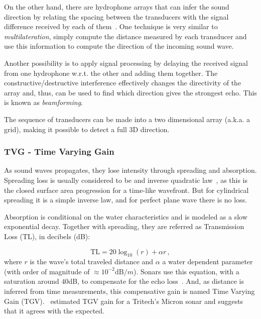 On the other hand, there are hydrophone arrays that can infer the sound
direction by relating the spacing between the transducers with the signal
difference received by each of them~\cite{bearing,beamforming}. One technique is
very similar to \textit{multilateration}, simply compute the distance measured
by each transducer and use this information to compute the direction of the
incoming sound wave.


Another possibility is to apply signal processing by delaying the received
signal from one hydrophone w.r.t. the other and adding them together. The
constructive/destructive interference effectively changes the directivity of the
array and, thus, can be used to find which direction gives the strongest echo.
This is known as \textit{beamforming}.

The sequence of transducers can be made into a two dimensional array
(a.k.a. a grid), making it possible to detect a
full 3D direction.

\subsubsection{TVG - Time Varying Gain}\label{sss:tvg}

As sound waves propagates, they lose intensity through spreading and absorption.
Spreading loss is usually considered to be and inverse quadratic
law~\cite{Etter2013}, as this is the closed surface area progression for
a time-like wavefront. But for cylindrical spreading it is a simple inverse law,
and for perfect plane wave there is no loss.

Absorption is conditional on the water characteristics and is modeled as a
slow exponential decay. Together with spreading, they are referred as
Transmission Loss ($\text{TL}$), in decibels (dB):

\begin{equation*}
\text{TL} = 20\log_{10}(r) + \alpha r\,,
\end{equation*}
%
where $r$ is the wave's total traveled distance and $\alpha$ a water dependent
parameter (with order of magnitude of $\approx 10^{-2} \text{dB}/m$). Sonars use
this equation, with a saturation around $40$dB, to compensate for the echo
loss~\cite{chu2006time}. And, as distance is inferred from time measurements,
this compensative gain is named Time Varying Gain (TGV).~\citet{chew2013object}
estimated TGV gain for a Tritech's Micron sonar and suggests that it agrees with
the expected.


